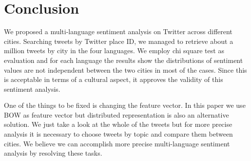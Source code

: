 \documentclass[twocolumn]{article}
\begin{document}
\vspace{-6mm}

\section{Conclusion}
\vspace{-2mm}
We proposed a multi-language sentiment analysis on Twitter across different cities.
Searching tweets by Twitter place ID, we managed to retrieve about a million tweets by city in the four languages.
We employ chi square test as evaluation and for each language the results show the distributions of sentiment values are not independent between the two cities in most of the cases.
Since this is acceptable in terms of a cultural aspect, it approves the validity of this sentiment analysis.

One of the things to be fixed is changing the feature vector.
In this paper we use BOW as feature vector but distributed representation is also an alternative solution.
We just take a look at the whole of the tweets but for more precise analysis it is necessary to choose tweets by topic and compare them between cities.
We believe we can accomplish more precise multi-language sentiment analysis by resolving these tasks.

\vspace{-6mm}


\end{document}
